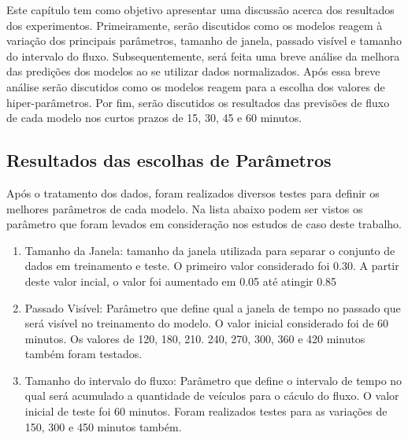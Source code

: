 





Este capítulo tem como objetivo apresentar uma discussão acerca dos resultados dos experimentos. Primeiramente, serão discutidos como os modelos reagem à variação dos principais parâmetros, tamanho de janela, passado visível e tamanho do intervalo do fluxo. Subsequentemente, será feita uma breve análise da melhora das predições dos modelos ao se utilizar dados normalizados. Após essa breve análise serão discutidos como os modelos reagem para a escolha dos valores de hiper-parâmetros. Por fim, serão discutidos os resultados das previsões de fluxo de cada modelo nos curtos prazos de 15, 30, 45 e 60 minutos.

\subsection{Resultados das escolhas de Parâmetros}

Após o tratamento dos dados, foram realizados diversos testes para definir os melhores parâmetros de cada modelo. Na lista abaixo podem ser vistos os parâmetro que foram levados em consideração nos estudos de caso deste trabalho.


\begin{enumerate}
	\item Tamanho da Janela: tamanho da janela utilizada para separar o conjunto de dados em treinamento e teste. O primeiro valor considerado foi 0.30. A partir deste valor incial, o valor foi aumentado em 0.05 até atingir 0.85
	\item Passado Visível: Parâmetro que define qual a janela de tempo no passado que será visível no treinamento do modelo. O valor inicial considerado foi de 60 minutos. Os valores de 120, 180, 210. 240, 270, 300, 360 e 420 minutos também foram testados.
	\item Tamanho do intervalo do fluxo: Parâmetro que define o intervalo de tempo no qual será acumulado a quantidade de veículos para o cáculo do fluxo. O valor inicial de teste foi 60 minutos. Foram realizados testes para as variações de 150, 300 e 450 minutos também.
\end{enumerate}


